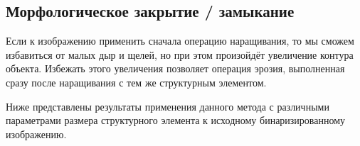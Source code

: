 \begin{figure}[H]
	\begin{minipage}[h]{0.49\linewidth}
	\end{minipage}
	\hfill
	\begin{minipage}[h]{0.49\linewidth}
	\end{minipage}
	\vfill
	\begin{minipage}[h]{0.49\linewidth}
	\end{minipage}
	\hfill
	\begin{minipage}[h]{0.49\linewidth}
	\end{minipage}
\end{figure}

\newpage

\subsection{Морфологическое закрытие / замыкание}

Если к изображению применить сначала операцию наращивания, то мы сможем избавиться от малых дыр и щелей, но при этом произойдёт увеличение контура объекта. Избежать этого увеличения позволяет операция эрозия, выполненная сразу после наращивания с тем же структурным элементом.

Ниже представлены результаты применения данного метода с различными параметрами размера структурного элемента к исходному бинаризированному изображению.

\begin{figure}[H]
	\begin{minipage}[h]{0.49\linewidth}
	\end{minipage}
	\hfill
	\begin{minipage}[h]{0.49\linewidth}
	\end{minipage}
	\vfill
	\begin{minipage}[h]{0.49\linewidth}
	\end{minipage}
	\hfill
	\begin{minipage}[h]{0.49\linewidth}
	\end{minipage}
\end{figure}


